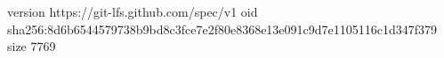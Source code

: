 version https://git-lfs.github.com/spec/v1
oid sha256:8d6b6544579738b9bd8c3fce7e2f80e8368e13e091c9d7e1105116c1d347f379
size 7769
